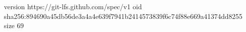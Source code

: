 version https://git-lfs.github.com/spec/v1
oid sha256:894690a45db56de3a4a4e639f7941b2414573839f6c74f88e669a41374dd8255
size 69
